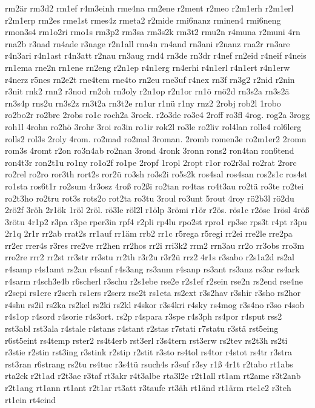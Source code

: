 {rm2är
rm3d2
rm1ef
r4m3einh
rme4na
rm2ene
r2ment
r2meo
r2m1erh
r2m1erl
r2m1erp
rm2es
rme1st
rmes4z
rmeta2
r2mide
rmi6nanz
rminen4
rmi6neng
rmon3s4
rm1o2ri
rmo1s
rm3p2
rm3sa
rm3s2k
rm3t2
rmu2n
r4muna
r2muni
4rn
rna2b
r3nad
rn4ade
r3nage
r2n1all
rna4n
rn4and
rn3ani
r2nanz
rna2r
rn3are
r4n3ari
r4n1ast
r4n3att
r2nau
rn3aug
rnd4
rn3de
rn3dr
r4nef
rn2eid
r4neif
r4neis
rn1ema
rne2n
rn1ene
rn2eng
r2n1ep
r4n1erg
rn4erhi
r4n1erl
r4n1ert
r4n1erw
r4nerz
r5nes
rn2e2t
rne4tem
rne4to
rn2eu
rne3uf
r4nex
rn3f
rn3g2
r2nid
r2nin
r3nit
rnk2
rnn2
r3nod
rn2oh
rn3oly
r2n1op
r2n1or
rn1ö
rnö2d
rn3s2a
rn3s2ä
rn3s4p
rns2u
rn3s2z
rn3t2a
rn3t2e
rn1ur
r1nü
r1ny
rnz2
2robj
rob2l
1robo
ro2bo2r
ro2bre
2robs
ro1c
roch2a
3rock.
r2o3de
ro3e4
2roff
ro3fl
4rog.
rog2a
3rogg
roh1l
4rohn
ro2hö
3rohr
3roi
ro3in
ro1ir
rok2l
ro3le
ro2liv
rol4lan
rolle4
rol6lerg
rolls2
rol3s
2roly
4rom.
ro2mad
ro2mal
3roman.
2romb
romen3e
ro2m1er2
2romn
rom3s
4romt
r2on
ro3n4ab
ro2nan
3rond
4ronk
3ronn
rons2
ron4tan
ron6tend
ron4t3r
ron2t1u
ro1ny
ro1o2f
ro1pe
2ropf
1ropl
2ropt
r1or
ro2r3al
ro2rat
2rorc
ro2rel
ro2ro
ror3th
rort2s
ror2ü
ro3sh
ro3s2i
ro5s2k
ros4sal
ros4san
ros2s1c
ros4st
ro1sta
ros6t1r
ro2sum
4r3osz
4roß
ro2ßi
ro2tan
ro4tas
ro4t3au
ro2tä
ro3te
ro2tei
ro2t3ho
ro2tru
rot3s
rots2o
rot2ta
ro3tu
3roul
ro3unt
5rout
4roy
rö2b3l
rö2du
2rö2f
3röh
2r1ök
1röl
2röl.
rö3le
röl2l
r1ölp
3römi
r1ör
r2ös.
rös1c
r2öse
1rösl
4röß
3rötu
4r1p2
r3pa
r3pe
rper3in
rpf4
r2pli
rp4lu
rpo2st
rpro1
rp3se
rps3t
r4pt
r3pu
2r1q
2r1r
rr2ab
rrat2s
rr1auf
rr1äm
rrb2
rr1c
r5rega
r5regi
rr2ei
rre2le
rre2pa
rr2er
rrer4s
r3res
rre2ve
rr2hen
rr2hos
rr2i
rri3k2
rrm2
rrn3au
rr2o
rr3obs
rro3m
rro2re
rrr2
rr2st
rr3str
rr3stu
rr2th
r3r2u
r3r2ü
rrz2
4r1s
r3sabo
r2s1a2d
rs2al
r4samp
r4s1amt
rs2an
r4sanf
r4s3ang
rs3anm
r4sanp
rs3ant
rs3anz
rs3ar
rs4ark
r4sarm
r4sch3e4b
r6scherl
r3schu
r2s1ebe
rse2e
r2s1ef
r2sein
rse2n
rs2end
rse4ne
r2sepi
rs1ere
r2serh
rs1ers
r2serz
rse2t
rs1eta
rs2ext
r3s2hav
r3shir
r3sho
rs2hor
r4shu
rs2il
rs2ka
rs2kel
rs2ki
rs2kl
r4skor
r3s4kri
r4sky
rs4mog
r3s4no
r3so
r4sob
r4s1op
r4sord
r4sorie
r4s3ort.
rs2p
r4spara
r3spe
r4s3ph
rs4por
r4sput
rss2
rst3abl
rst3ala
r4stale
r4stans
r4stant
r2stas
r7stati
r7statu
r3stä
rst5eing
r6st5eint
rs4temp
rster2
rs4t4erb
rst3erl
r3s4tern
rst3erw
rs2tev
rs2t3h
rs2ti
r3stie
r2stin
rst3ing
r3stink
r2stip
r2stit
r3sto
rs4tol
rs4tor
r4stot
rs4tr
r3stra
rst3ran
r6strang
rs2tu
rs4tuc
r3s4tü
rsuch4s
r3suf
r3sy
r1ß
4r1t
r2tabo
rt1abs
rta2ck
r2t1ad
r2t3ae
r3taf
rt3akr
r4t3albe
rta3l2e
r2t1all
rt1am
rt2ame
r3t2anb
r2t1ang
rt1ann
rt1ant
r2t1ar
rt3att
r3taufe
rt3äh
rt1änd
rt1ärm
rte1e2
r3teh
rt1ein
rt4eind
}
